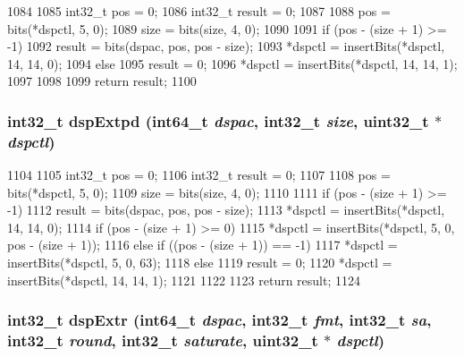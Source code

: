 \begin{DoxyCode}
1084 {
1085     int32_t pos = 0;
1086     int32_t result = 0;
1087 
1088     pos = bits(*dspctl, 5, 0);
1089     size = bits(size, 4, 0);
1090 
1091     if (pos - (size + 1) >= -1) {
1092         result = bits(dspac, pos, pos - size);
1093         *dspctl = insertBits(*dspctl, 14, 14, 0);
1094     } else {
1095         result = 0;
1096         *dspctl = insertBits(*dspctl, 14, 14, 1);
1097     }
1098 
1099     return result;
1100 }
\end{DoxyCode}
\hypertarget{namespaceMipsISA_a0b12eac93513ce034deb16dc654db7be}{
\subsubsection[{dspExtpd}]{\setlength{\rightskip}{0pt plus 5cm}int32\_\-t dspExtpd (int64\_\-t {\em dspac}, \/  int32\_\-t {\em size}, \/  {\bf uint32\_\-t} $\ast$ {\em dspctl})}}
\label{namespaceMipsISA_a0b12eac93513ce034deb16dc654db7be}



\begin{DoxyCode}
1104 {
1105     int32_t pos = 0;
1106     int32_t result = 0;
1107 
1108     pos = bits(*dspctl, 5, 0);
1109     size = bits(size, 4, 0);
1110 
1111     if (pos - (size + 1) >= -1) {
1112         result = bits(dspac, pos, pos - size);
1113         *dspctl = insertBits(*dspctl, 14, 14, 0);
1114         if (pos - (size + 1) >= 0)
1115             *dspctl = insertBits(*dspctl, 5, 0, pos - (size + 1));
1116         else if ((pos - (size + 1)) == -1)
1117             *dspctl = insertBits(*dspctl, 5, 0, 63);
1118     } else {
1119         result = 0;
1120         *dspctl = insertBits(*dspctl, 14, 14, 1);
1121     }
1122 
1123     return result;
1124 }
\end{DoxyCode}
\hypertarget{namespaceMipsISA_add5a0b9b060578a4f173a8e875cd283f}{
\subsubsection[{dspExtr}]{\setlength{\rightskip}{0pt plus 5cm}int32\_\-t dspExtr (int64\_\-t {\em dspac}, \/  int32\_\-t {\em fmt}, \/  int32\_\-t {\em sa}, \/  int32\_\-t {\em round}, \/  int32\_\-t {\em saturate}, \/  {\bf uint32\_\-t} $\ast$ {\em dspctl})}}
\label{namespaceMipsISA_add5a0b9b060578a4f173a8e875cd283f}



